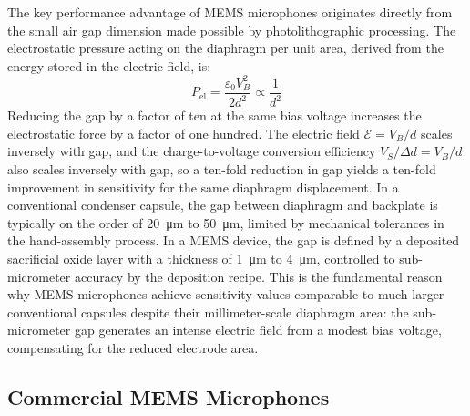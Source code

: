 The key performance advantage of MEMS microphones originates directly from the small air gap dimension made possible by photolithographic processing.
The electrostatic pressure acting on the diaphragm per unit area, derived from the energy stored in the electric field, is:
\[
P_{\mathrm{el}} = \frac{\varepsilon_0V_B^2}{2d^2} \propto \frac{1}{d^2}
\]
Reducing the gap by a factor of ten at the same bias voltage increases the electrostatic force by a factor of one hundred.
The electric field \( \mathcal{E} = V_B/d \) scales inversely with gap, and the charge-to-voltage conversion efficiency \( V_S/\Delta d = V_B/d \) also scales inversely with gap, so a ten-fold reduction in gap yields a ten-fold improvement in sensitivity for the same diaphragm displacement.
In a conventional condenser capsule, the gap between diaphragm and backplate is typically on the order of \SI{20}{\micro\meter} to \SI{50}{\micro\meter}, limited by mechanical tolerances in the hand-assembly process.
In a MEMS device, the gap is defined by a deposited sacrificial oxide layer with a thickness of \SI{1}{\micro\meter} to \SI{4}{\micro\meter}, controlled to sub-micrometer accuracy by the deposition recipe.
This is the fundamental reason why MEMS microphones achieve sensitivity values comparable to much larger conventional capsules despite their millimeter-scale diaphragm area: the sub-micrometer gap generates an intense electric field from a modest bias voltage, compensating for the reduced electrode area.

\subsection{Commercial MEMS Microphones}

